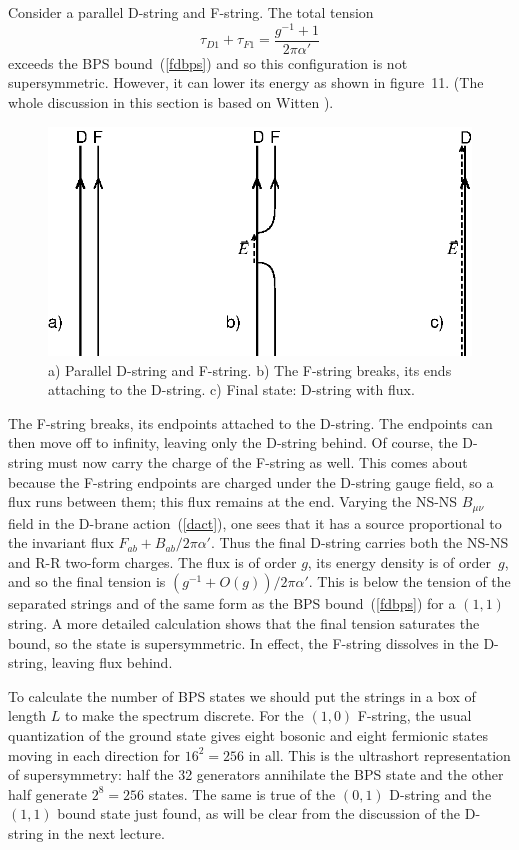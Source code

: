 \documentclass[12pt]{article}
\def\be{\begin{equation}}
\def\ee{\end{equation}}
\def\ap{\alpha'}
\def\apm{\alpha'}
\begin{document}
Consider a parallel D-string and F-string.  The total
tension
\be
\tau_{D1} + \tau_{F1} = \frac{g^{-1} + 1}{ 2\pi\apm}
\ee 
exceeds the BPS
bound~(\ref{fdbps}) and so this configuration is not supersymmetric.  However,
it can lower its energy as shown in figure~11.  (The whole discussion in
this section is based on Witten \cite{witbound}).
\begin{figure}
\begin{center}
\leavevmode
\includegraphics{fdbound.eps}
\end{center}
\caption[]{a) Parallel D-string and F-string.  b) The F-string breaks, its
ends attaching to the D-string.  c) Final state: D-string with flux.}
\end{figure}
The F-string breaks, its endpoints attached to the D-string.  The endpoints
can then move off to infinity, leaving only the D-string behind.  Of course,
the D-string must now carry the charge of the F-string as well.  This comes
about because the F-string endpoints are charged under the D-string gauge
field, so a flux runs between them; this flux remains at the end.  Varying the
NS-NS $B_{\mu\nu}$ field in the D-brane action~(\ref{dact}), one sees that it
has a source proportional to the invariant flux $F_{ab} + B_{ab} / 2\pi\ap$. 
Thus the final D-string carries both the NS-NS and R-R two-form charges.  The
flux is of order $g$, its energy density is of order~$g$, and
so the final tension is $(g^{-1} + O(g))/2\pi\apm$.  This is below the tension
of the separated strings and of the same form as the BPS bound~(\ref{fdbps})
for a $(1,1)$ string.  A more detailed calculation shows that the final
tension saturates the bound, \cite{rract} so the state is supersymmetric.  In
effect, the F-string dissolves in the D-string, leaving flux behind.

To calculate the number of BPS states we should put the strings in a box of
length $L$ to make the spectrum discrete.  For the $(1,0)$ F-string, the usual
quantization of the ground state gives eight bosonic and eight fermionic
states moving in each direction for $16^2 = 256$ in all.  This is the
ultrashort representation of supersymmetry: half the 32 generators
annihilate the BPS state and the other half generate $2^8 = 256$ states.  The
same is true of the $(0,1)$ D-string and the $(1,1)$ bound state just found,
as will be clear from the discussion of the D-string in the next lecture.
\end{document}

